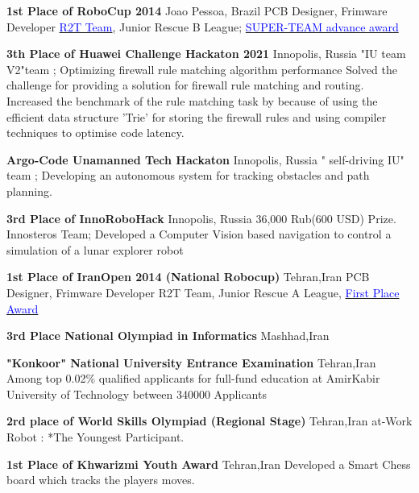 {\textbf{1st Place of RoboCup 2014}}
{Joao Pessoa, Brazil}
{\newline PCB Designer, Frimware Developer}
{}
{
\href{http://www.robocup2014.org/?page_id=3318}{\textcolor{blue}{R2T Team}}, Junior Rescue B League; \href{https://drive.google.com/file/d/1r-OCgC7kt6sOVfw2KTvrFq5kaBQ-nFiU/view?usp=sharing}{\textcolor{blue}{SUPER-TEAM advance award}}}



{\textbf{3th Place of Huawei Challenge Hackaton 2021}}
{Innopolis, Russia}
{}
{}
{
"IU team V2"team ; Optimizing firewall rule matching algorithm performance
Solved the challenge for providing a solution for firewall rule matching and routing. 
        Increased the benchmark of the rule matching task by  because of using the efficient data structure 'Trie' for storing the firewall rules and using compiler techniques to optimise code latency. 
 }

{\textbf{Argo-Code Unamanned Tech Hackaton }}
{Innopolis, Russia}
{}
{}
{
" self-driving IU" team ; Developing an autonomous system for tracking obstacles and path planning. 
} 
 
{\textbf{3rd Place of InnoRoboHack }}
{Innopolis, Russia}
{}
{}
{
36,000 Rub(600 USD) Prize.
Innosteros Team; Developed a Computer Vision based navigation to control a simulation of a lunar explorer robot 
}
 

{\textbf{1st Place of IranOpen 2014 (National Robocup)}}
{Tehran,Iran}
{\newline PCB Designer, Frimware Developer}
{}
{
	R2T Team, Junior Rescue A League, \href{https://drive.google.com/file/d/1SVeY8KieeonJo1rX8eTNVhbd5ya61Gct/view?usp=sharing}{\textcolor{blue}{First Place Award}}
}

{\textbf{3rd Place National Olympiad in Informatics }}
{Mashhad,Iran}
{}
{}
{	
}


{\textbf{"Konkoor" National University Entrance Examination}}
{Tehran,Iran}
{}
{}
{
Among top 0.02\% qualified applicants for full-fund education at AmirKabir University of Technology between 340000 Applicants
}


{\textbf{2rd place of World Skills Olympiad (Regional Stage)}}
{Tehran,Iran}
{}
{}
{
  at-Work Robot : *The Youngest Participant.
}

{\textbf{1st Place of Khwarizmi Youth Award }}
{Tehran,Iran}
{}
{}
{
    Developed a Smart Chess board which tracks the players moves.
}



